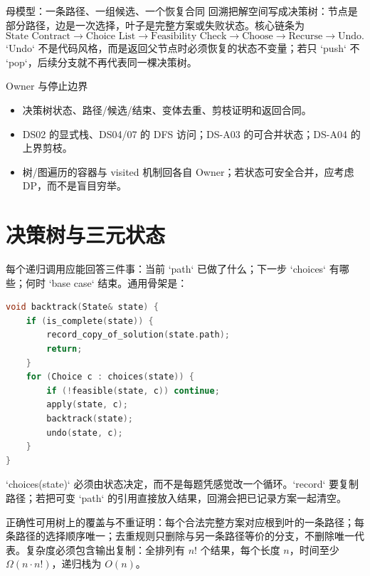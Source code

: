 \documentclass[UTF8,fontset=none,11pt,a4paper]{ctexart}
\begin{document}

\begin{corebox}{母模型：一条路径、一组候选、一个恢复合同}
回溯把解空间写成决策树：节点是部分路径，边是一次选择，叶子是完整方案或失败状态。核心链条为
\[
\text{State Contract}
\to\text{Choice List}
\to\text{Feasibility Check}
\to\text{Choose}
\to\text{Recurse}
\to\text{Undo}.
\]
`Undo` 不是代码风格，而是返回父节点时必须恢复的状态不变量；若只 `push` 不 `pop`，后续分支就不再代表同一棵决策树。
\end{corebox}

\begin{methodbox}{Owner 与停止边界}
\begin{itemize}
\item {}决策树状态、路径/候选/结束、变体去重、剪枝证明和返回合同。
\item {}DS02 的显式栈、DS04/07 的 DFS 访问；DS-A03 的可合并状态；DS-A04 的上界剪枝。
\item {}树/图遍历的容器与 visited 机制回各自 Owner；若状态可安全合并，应考虑 DP，而不是盲目穷举。
\end{itemize}
\end{methodbox}
\tableofcontents\newpage

\section{决策树与三元状态}

每个递归调用应能回答三件事：当前 `path` 已做了什么；下一步 `choices` 有哪些；何时 `base case` 结束。通用骨架是：
\begin{lstlisting}[language=C++,caption={回溯状态转移骨架}]
void backtrack(State& state) {
    if (is_complete(state)) {
        record_copy_of_solution(state.path);
        return;
    }
    for (Choice c : choices(state)) {
        if (!feasible(state, c)) continue;
        apply(state, c);
        backtrack(state);
        undo(state, c);
    }
}
\end{lstlisting}
`choices(state)` 必须由状态决定，而不是每题凭感觉改一个循环。`record` 要复制路径；若把可变 `path` 的引用直接放入结果，回溯会把已记录方案一起清空。

正确性可用树上的覆盖与不重证明：每个合法完整方案对应根到叶的一条路径；每条路径的选择顺序唯一；去重规则只删除与另一条路径等价的分支，不删除唯一代表。复杂度必须包含输出复制：全排列有 $n!$ 个结果，每个长度 $n$，时间至少 $\Omega(n\cdot n!)$，递归栈为 $O(n)$。
\end{document}
